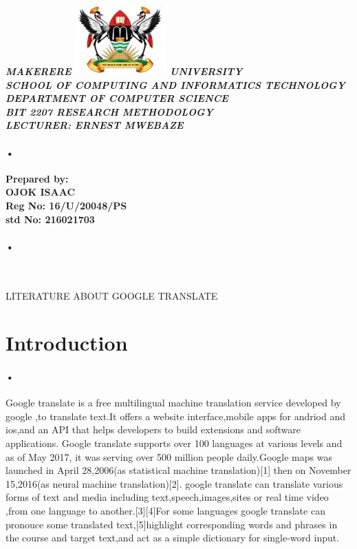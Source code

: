 \documentclass[12pt]{article}
\begin{document}
\begin{center}
\begin{normalsize}
\textbf\sl{MAKERERE \includegraphics[scale=0.5]{logo} UNIVERSITY }\\

\textbf\sl{SCHOOL OF COMPUTING AND INFORMATICS TECHNOLOGY} \\
\textbf\sl{DEPARTMENT OF COMPUTER SCIENCE} \\
\textbf\sl{BIT 2207 RESEARCH METHODOLOGY} \\
\textbf\sl{LECTURER: ERNEST MWEBAZE} \\
\paragraph*{•}
\textbf{Prepared by:}\\
\textbf{\sc OJOK ISAAC } \\
\textbf{\sc Reg No: 16/U/20048/PS } \\
\textbf{\sc std No: 216021703}\\
\paragraph*{•}
\
\newpage


\textsc{ LITERATURE ABOUT GOOGLE TRANSLATE}\\ 

\end{normalsize}
\end{center}

\section{Introduction}
\paragraph{•}
Google translate is a free multilingual machine translation service developed by google ,to translate text.It offers a website interface,mobile apps for andriod and ios,and an API that helps developers to build extensions and software applications.
Google translate supports over 100 languages at various levels and as of May 2017, it was serving over 500 million people daily.Google maps was launched in April 28,2006(as statistical machine translation)[1] then on November 15,2016(as neural machine translation)[2].
google translate can translate various forms of text and media including text,speech,images,sites or real time video ,from one language to another.[3][4]For some languages google translate can pronouce some translated text,[5]highlight corresponding words and phrases in the course and target text,and act as a simple dictionary for single-word input.
\end{document}
